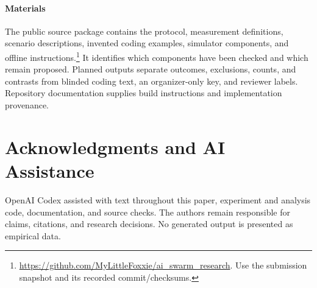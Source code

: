 \documentclass[10pt,conference]{IEEEtran}
\begin{document}
\paragraph{Materials}
The public source package contains the protocol, measurement definitions, scenario descriptions, invented coding examples, simulator components, and offline instructions.\footnote{\url{https://github.com/MyLittleFoxxie/ai_swarm_research}. Use the submission snapshot and its recorded commit/checksums.} It identifies which components have been checked and which remain proposed. Planned outputs separate outcomes, exclusions, counts, and contrasts from blinded coding text, an organizer-only key, and reviewer labels. Repository documentation supplies build instructions and implementation provenance.

\section*{Acknowledgments and AI Assistance}
OpenAI Codex \cite{openai2026codex} assisted with text throughout this paper, experiment and analysis code, documentation, and source checks. The authors remain responsible for claims, citations, and research decisions. No generated output is presented as empirical data.


\end{document}
